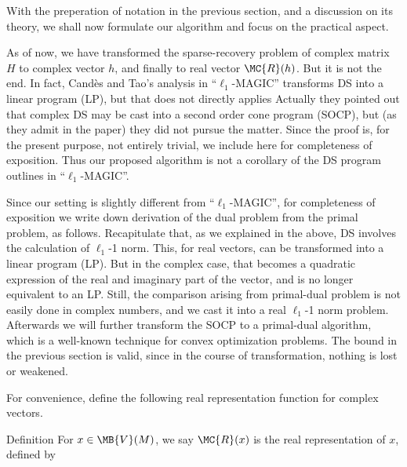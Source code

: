 \startchapter [title={Simulation}]

With the preperation of notation in the previous section, and a discussion on its theory, we shall now formulate our algorithm and focus on the practical aspect.

As of now, we have transformed the sparse-recovery problem of complex matrix \(H\) to complex vector \(h\), and finally to real vector \(\MC{R}(h)\).
But it is not the end.
In fact, Cand\`es and Tao's analysis in ``\(\ell_1\)-MAGIC'' transforms DS into a linear program (LP), but that does not directly applies
Actually they pointed out that complex DS may be cast into a second order cone program (SOCP), but (as they admit in the paper) they did not pursue the matter.
Since the proof is, for the present purpose, not entirely trivial, we include here for completeness of exposition.
Thus our proposed algorithm is not a corollary of the DS program outlines in ``\(\ell_1\)-MAGIC''.

\startsection [title={Transformation into Second Order Cone Problem}]

Since our setting is slightly different from ``\(\ell_1\)-MAGIC'', for completeness of exposition we write down derivation of the dual problem from the primal problem, as follows.
Recapitulate that, as we explained in the above, DS involves the calculation of \(\ell_1\)-1 norm.
This, for real vectors, can be transformed into a linear program (LP).
But in the complex case, that becomes a quadratic expression of the real and imaginary part of the vector, and is no longer equivalent to an LP.
Still, the comparison arising from primal-dual problem is not easily done in complex numbers, and we cast it into a real \(\ell_1\)-1 norm problem.
Afterwards we will further transform the SOCP to a primal-dual algorithm, which is a well-known technique for convex optimization problems.
The bound in the previous section is valid, since in the course of transformation, nothing is lost or weakened.

For convenience, define the following real representation function for complex vectors.

\Result
{Definition}
{
For \(x \in \MB{V}(M)\), we say \(\MC{R}(x)\) is the real representation of \(x\), defined by
%
%
}

